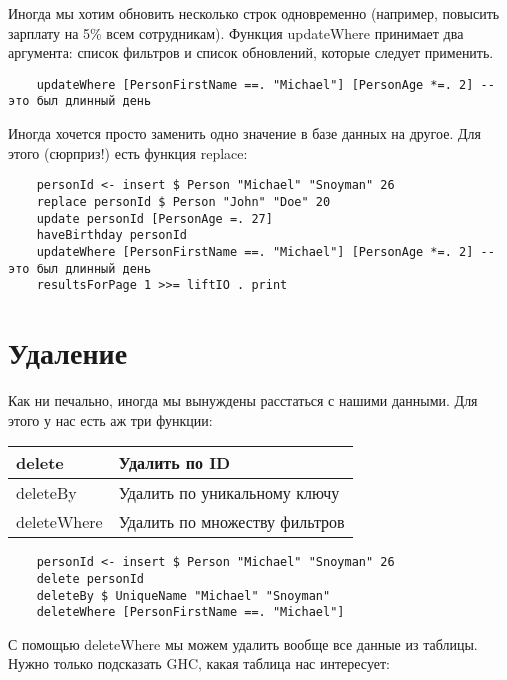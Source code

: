 Иногда мы хотим обновить несколько строк одновременно (например, повысить зарплату на 5\% всем сотрудникам). Функция updateWhere принимает два аргумента: список фильтров и список обновлений, которые следует применить. %

\begin{lstlisting}
    updateWhere [PersonFirstName ==. "Michael"] [PersonAge *=. 2] -- это был длинный день
\end{lstlisting}

Иногда хочется просто заменить одно значение в базе данных на другое. Для этого (сюрприз!) есть функция replace:

\begin{lstlisting}
    personId <- insert $ Person "Michael" "Snoyman" 26
    replace personId $ Person "John" "Doe" 20
    update personId [PersonAge =. 27]
    haveBirthday personId
    updateWhere [PersonFirstName ==. "Michael"] [PersonAge *=. 2] -- это был длинный день
    resultsForPage 1 >>= liftIO . print
\end{lstlisting}%

\section{Удаление} %

Как ни печально, иногда мы вынуждены расстаться с нашими данными. Для этого у нас есть аж три функции:

\begin{center}
\begin{tabular}{ | l | l |}
\hline
delete & Удалить по ID \\ \hline
deleteBy & Удалить по уникальному ключу \\ \hline
deleteWhere & Удалить по множеству фильтров \\ \hline
\end{tabular}
\end{center}

\begin{lstlisting}
    personId <- insert $ Person "Michael" "Snoyman" 26
    delete personId
    deleteBy $ UniqueName "Michael" "Snoyman"
    deleteWhere [PersonFirstName ==. "Michael"]
\end{lstlisting}%

С помощью deleteWhere мы можем удалить вообще все данные из таблицы. Нужно только подсказать GHC, какая таблица нас интересует:

